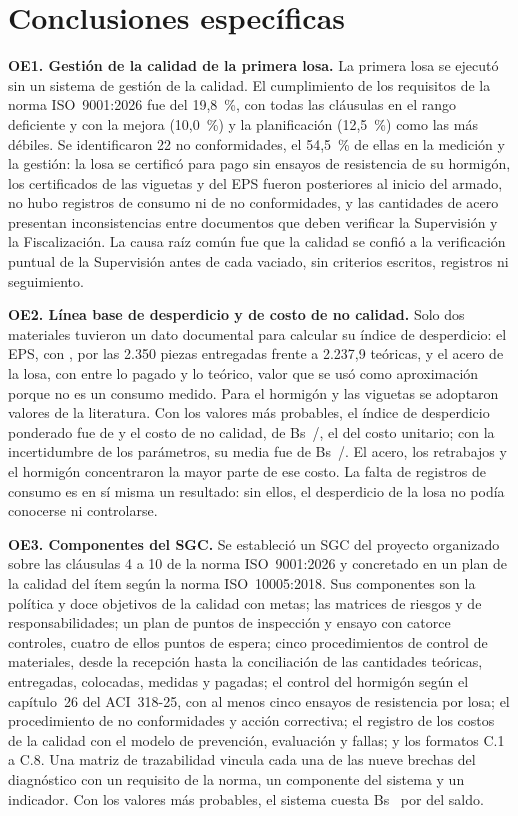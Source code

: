 \section{Conclusiones específicas}

\textbf{OE1. Gestión de la calidad de la primera losa.} La primera losa se ejecutó sin un sistema de gestión de la calidad. El cumplimiento de los requisitos de la norma ISO~9001:2026 fue del 19,8~\%, con todas las cláusulas en el rango deficiente y con la mejora (10,0~\%) y la planificación (12,5~\%) como las más débiles. Se identificaron 22 no conformidades, el 54,5~\% de ellas en la medición y la gestión: la losa se certificó para pago sin ensayos de resistencia de su hormigón, los certificados de las viguetas y del EPS fueron posteriores al inicio del armado, no hubo registros de consumo ni de no conformidades, y las cantidades de acero presentan inconsistencias entre documentos que deben verificar la Supervisión y la Fiscalización. La causa raíz común fue que la calidad se confió a la verificación puntual de la Supervisión antes de cada vaciado, sin criterios escritos, registros ni seguimiento.

\textbf{OE2. Línea base de desperdicio y de costo de no calidad.} Solo dos materiales tuvieron un dato documental para calcular su índice de desperdicio: el EPS, con \IDMsinEps{}, por las 2.350 piezas entregadas frente a 2.237,9 teóricas, y el acero de la losa, con \IDMsinAce{} entre lo pagado y lo teórico, valor que se usó como aproximación porque no es un consumo medido. Para el hormigón y las viguetas se adoptaron valores de la literatura. Con los valores más probables, el índice de desperdicio ponderado fue de \IDMsinDet{} y el costo de no calidad, de Bs~\CNCsinDet/\mdos{}, el \CNCsinDetPct{} del costo unitario; con la incertidumbre de los parámetros, su media fue de Bs~\CNCsinMedia/\mdos{}. El acero, los retrabajos y el hormigón concentraron la mayor parte de ese costo. La falta de registros de consumo es en sí misma un resultado: sin ellos, el desperdicio de la losa no podía conocerse ni controlarse.

\textbf{OE3. Componentes del SGC.} Se estableció un SGC del proyecto organizado sobre las cláusulas 4 a 10 de la norma ISO~9001:2026 y concretado en un plan de la calidad del ítem según la norma ISO~10005:2018. Sus componentes son la política y doce objetivos de la calidad con metas; las matrices de riesgos y de responsabilidades; un plan de puntos de inspección y ensayo con catorce controles, cuatro de ellos puntos de espera; cinco procedimientos de control de materiales, desde la recepción hasta la conciliación de las cantidades teóricas, entregadas, colocadas, medidas y pagadas; el control del hormigón según el capítulo~26 del ACI~318-25, con al menos cinco ensayos de resistencia por losa; el procedimiento de no conformidades y acción correctiva; el registro de los costos de la calidad con el modelo de prevención, evaluación y fallas; y los formatos C.1 a C.8. Una matriz de trazabilidad vincula cada una de las nueve brechas del diagnóstico con un requisito de la norma, un componente del sistema y un indicador. Con los valores más probables, el sistema cuesta Bs~\CCconDet{} por \mdos{} del saldo.

